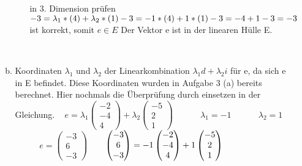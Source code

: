 \documentclass[10pt,ngerman]{scrartcl}
\begin{document}
\begin{enumerate}[1.]
\begin{enumerate}[(a)]
\begin{enumerate}
	in 3. Dimension prüfen \newline
	\begin{math}
	-3 = \lambda _1 * (4) + \lambda _2 * (1) \newline
	-3 = -1 * (4) + 1 * (1) \newline
	-3  = -4 + 1\newline
	-3  = -3 
	\end{math} ist korrekt, somit \begin{math}e \in E \end{math}\newline
	Der Vektor e ist in der linearen Hülle E.
	
	\end{enumerate}
	
		~\newpage
	
	\item Koordinaten $\lambda _1$ und $\lambda _2$ der Linearkombination $\lambda _1 d + \lambda _2 i$ für e, da sich e in E befindet. Diese Koordinaten wurden in Aufgabe 3 (a) bereits berechnet. Hier nochmals die Überprüfung durch einsetzen in der Gleichung. \newline ~ \newline
	\begin{math}e = \lambda _1 \begin{pmatrix}-2 \\ -4 \\ 4\end{pmatrix} + \lambda _2\begin{pmatrix}-5 \\ 2 \\ 1\end{pmatrix} \end{math} ~~~~~  $\lambda _ 1 = -1$ ~~~~~  $\lambda _ 2 = 1 $  ~~~~~  $e =	\begin{pmatrix}-3 \\ 6 \\ -3\end{pmatrix}$
	\newline ~ \newline ~ \newline
	\begin{math} \begin{pmatrix}-3 \\ 6 \\ -3\end{pmatrix} = -1 \begin{pmatrix}-2 \\ -4 \\ 4\end{pmatrix} + 1 \begin{pmatrix}-5 \\ 2 \\ 1\end{pmatrix} \newline

\end{math}
\end{enumerate}
\end{enumerate}
\end{document}
